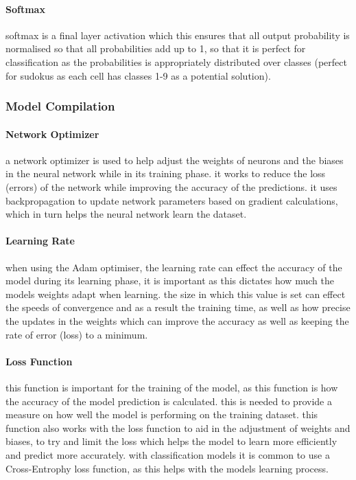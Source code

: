 \documentclass[]{final_report}
\begin{document}
\paragraph{Softmax}
softmax is a final layer activation which this ensures that all output probability is normalised so that all probabilities add up to 1, so that it is perfect for classification as the probabilities is appropriately distributed over classes (perfect for sudokus as each cell has classes 1-9 as a potential solution).

\subsubsection{Model Compilation}

\paragraph{Network Optimizer}
a network optimizer is used to help adjust the weights of neurons and the biases in the neural network while in its training phase. it works to reduce the loss (errors) of the network while improving the accuracy of the predictions. it uses backpropagation to update network parameters based on gradient calculations, which in turn helps the neural network learn the dataset.

\paragraph{Learning Rate}
when using the Adam optimiser, the learning rate can effect the accuracy of the model during its learning phase, it is important as this dictates how much the models weights adapt when learning. the size in which this value is set can effect the speeds of convergence and as a result the training time, as well as how precise the updates in the weights which can improve the accuracy as well as keeping the rate of error (loss) to a minimum.

\paragraph{Loss Function}
this function is important for the training of the model, as this function is how the accuracy of the model prediction is calculated. this is needed to provide a measure on how well the model is performing on the training dataset. this function also works with the loss function to aid in the adjustment of weights and biases, to try and limit the loss which helps the model to learn more efficiently and predict more accurately. with classification models it is common to use a Cross-Entrophy loss function, as this helps with the models learning process.
\end{document}
